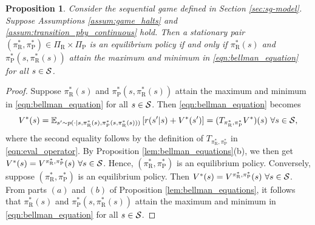 \documentclass[11pt]{article}
\newtheorem{proposition}{Proposition}
\begin{document}
       \begin{proposition}
           \label{lem:stationary_pol_optimal}
           Consider the sequential game defined in Section \ref{sec:sg-model}. Suppose Assumptions \ref{assum:game_halts} and \ref{assum:transition_pby_continuous} hold. Then a stationary pair $(\pi_\text{R}^*,\pi_\text{P}^*) \in \Pi_\text{R} \times \Pi_\text{P}$ is an equilibrium policy if and only if $\pi_\text{R}^*(s)$ and $\pi_\text{P}^*(s,\pi_\text{R}^*(s))$ attain the maximum and minimum in \eqref{eqn:bellman_equation} for all $s \in {\cal S}$.
       \end{proposition}
       \begin{proof}
           Suppose $\pi_\text{R}^*(s)$ and $\pi_\text{P}^*(s,\pi_\text{R}^*(s))$ attain the maximum and minimum in \eqref{eqn:bellman_equation} for all $s \in {\cal S}$. Then \eqref{eqn:bellman_equation} becomes
           \[
           V^*(s) = \mathbb{E}_{s' \sim p(\cdot|s,\pi_\text{R}^*(s),\pi_\text{P}^*(s,\pi_\text{R}^*(s)))}\left[r(s'|s) + V^*(s')\right] = (T_{\pi_\text{R}^*,\pi_\text{P}^*}V^*)(s)  \ \forall s \in {\cal S},
           \]
           where the second equality follows by the definition of $T_{\pi_\text{R}^*,\pi_\text{P}^*}$ in \eqref{eqn:eval_operator}. By Proposition  \ref{lem:bellman_equations}(b), we then get $V^*(s)=V^{\pi_\text{R}^*,\pi_\text{P}^*}(s) \ \forall s \in {\cal S}$. Hence, $(\pi_\text{R}^*,\pi_\text{P}^*)$ is an equilibrium policy. Conversely, suppose $(\pi_\text{R}^*,\pi_\text{P}^*)$ is an equilibrium policy. Then $V^*(s) = V^{\pi_\text{R}^*,\pi_\text{P}^*}(s) \ \forall s \in {\cal S}$. From parts $(a)$ and $(b)$ of Proposition   \ref{lem:bellman_equations}, it follows that $\pi_\text{R}^*(s)$ and $\pi_\text{P}^*(s,\pi_\text{R}^*(s))$ attain the maximum and minimum in \eqref{eqn:bellman_equation} for all $s \in {\cal S}$.
       \end{proof}
    
\end{document}
